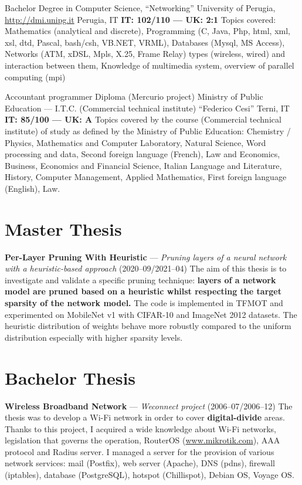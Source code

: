 \documentclass[10pt,a4paper,sans]{moderncv}
\begin{document}
    {Bachelor Degree in Computer Science, ``Networking''}
    {University of Perugia, \url{http://dmi.unipg.it}}
    {Perugia, IT}
    {\textbf{IT\@: 102/110 --- UK\@: 2:1}}
    {Topics covered: Mathematics (analytical and discrete), Programming (C,
    Java, Php, html, xml, xsl, dtd, Pascal, bash/csh, VB.NET, VRML), Databases
    (Mysql, MS Access), Networks (ATM, xDSL, Mpls, X.25, Frame Relay) types
    (wireless, wired) and interaction between them, Knowledge of multimedia
    system, overview of parallel computing (mpi)}

    {Accountant programmer Diploma (Mercurio project)}
    {Ministry of Public Education --- I.T.C. (Commercial technical institute)
        ``Federico Cesi''}
    {Terni, IT}
    {\textbf{IT\@: 85/100 --- UK\@: A}}
    {Topics covered by the course (Commercial technical institute) of study as
    defined by the Ministry of Public Education: Chemistry / Physics,
    Mathematics and Computer Laboratory, Natural Science, Word processing and
    data, Second foreign language (French), Law and Economics, Business,
    Economics and Financial Science, Italian Language and Literature, History,
    Computer Management, Applied Mathematics, First foreign language (English),
    Law.}

\section{Master Thesis}
    {\textbf{Per-Layer Pruning With Heuristic} --- \emph{Pruning layers of a
        neural network with a heuristic-based approach}
        (2020--09/2021--04)}
    {The aim of this thesis is to investigate and validate a specific pruning
    technique: \textbf{layers of a network model are pruned based on a
    heuristic whilst respecting the target sparsity of the network model.}
    The code is implemented in TFMOT and experimented on MobileNet v1 with
    CIFAR-10 and ImageNet 2012 datasets.
    The heuristic distribution of weights behave more robustly compared to the
    uniform distribution especially with higher sparsity levels.}

\section{Bachelor Thesis}
    {\textbf{Wireless Broadband Network} --- \emph{Weconnect project}
        (2006--07/2006--12)}
    {The thesis was to develop a Wi-Fi network in order to cover
    \textbf{digital-divide} areas. Thanks to this project, I acquired a wide
    knowledge about Wi-Fi networks, legislation that governs the operation,
    RouterOS (\url{www.mikrotik.com}), AAA protocol and Radius server. I
    managed a server for the provision of various network services: mail
    (Postfix), web server (Apache), DNS (pdns), firewall (iptables), database
    (PostgreSQL), hotspot (Chillispot), Debian OS, Voyage OS.}
\end{document}
